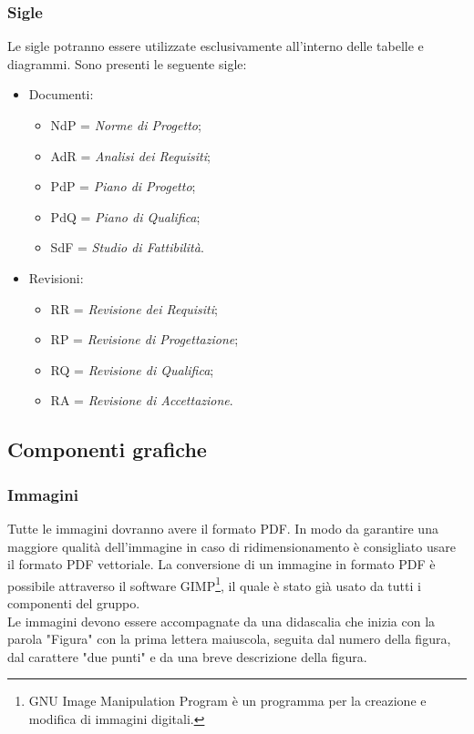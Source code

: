 \subsubsection{Sigle}
Le sigle potranno essere utilizzate esclusivamente all'interno delle tabelle e diagrammi. Sono presenti le seguente sigle: 
\begin{itemize}
	\item Documenti:
	\begin{itemize}
		\item NdP = \textit{Norme di Progetto};
		\item AdR = \textit{Analisi dei Requisiti};
		\item PdP = \textit{Piano di Progetto};
		\item PdQ = \textit{Piano di Qualifica};
		\item SdF = \textit{Studio di Fattibilità}.
	\end{itemize}
	\item Revisioni:
	\begin{itemize}
		\item RR = \textit{Revisione dei Requisiti};
		\item RP = \textit{Revisione di Progettazione};
		\item RQ = \textit{Revisione di Qualifica};
		\item RA = \textit{Revisione di Accettazione}.
	\end{itemize}
\end{itemize}

\subsection{Componenti grafiche}
\subsubsection{Immagini}
Tutte le immagini dovranno avere il formato \gls{PDF}. In modo da garantire una maggiore qualità dell'immagine in caso di ridimensionamento è consigliato usare il formato \gls{PDF} vettoriale. La conversione di un immagine in formato \gls{PDF} è possibile attraverso il software GIMP\footnote{GNU Image Manipulation Program è un programma per la creazione e modifica di immagini digitali.}, il quale è stato già usato da tutti  i componenti del gruppo. \\ Le immagini devono essere accompagnate da una didascalia che inizia con la parola "Figura" con la prima lettera maiuscola, seguita dal numero della figura, dal carattere "due punti" e da una breve descrizione della figura.
